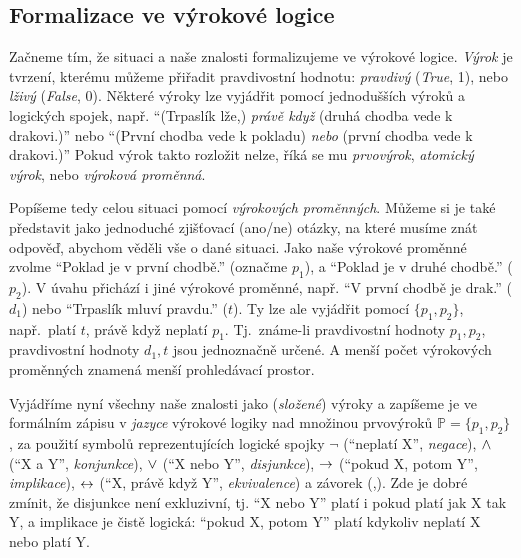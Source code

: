 \subsection{Formalizace ve výrokové logice}

Začneme tím, že situaci a naše znalosti formalizujeme ve výrokové logice. \emph{Výrok} je tvrzení, kterému můžeme přiřadit pravdivostní hodnotu: \emph{pravdivý} (\emph{True}, 1), nebo \emph{lživý} (\emph{False}, 0). Některé výroky lze vyjádřit pomocí jednodušších výroků a logických spojek, např.  ``(Trpaslík lže,) \emph{právě když} (druhá chodba vede k drakovi.)'' nebo ``(První chodba vede k pokladu) \emph{nebo} (první chodba vede k drakovi.)'' Pokud výrok takto rozložit nelze, říká se mu \emph{prvovýrok}, \emph{atomický výrok}, nebo \emph{výroková proměnná}.

Popíšeme tedy celou situaci pomocí \emph{výrokových proměnných}. Můžeme si je také představit jako jednoduché zjišťovací (ano/ne) otázky, na které musíme znát odpověď, abychom věděli vše o dané situaci. Jako naše výrokové proměnné zvolme ``Poklad je v první chodbě.'' (označme \(p_1\)), a ``Poklad je v druhé chodbě.'' (\(p_2\)). V úvahu přichází i jiné výrokové proměnné, např. ``V první chodbě je drak.'' (\(d_1\)) nebo ``Trpaslík mluví pravdu.'' (\(t\)). Ty lze ale vyjádřit pomocí \( \{p_1,p_2\} \), např.\ platí \(t\), právě když neplatí \(p_1\). Tj.\ známe-li pravdivostní hodnoty \(p_1,p_2\), pravdivostní hodnoty \(d_1,t\) jsou jednoznačně určené. A menší počet výrokových proměnných znamená menší prohledávací prostor.

Vyjádříme nyní všechny naše znalosti jako (\emph{složené}) výroky a zapíšeme je ve formálním zápisu v \emph{jazyce} výrokové logiky nad množinou prvovýroků \( \mathbb P=\{p_1,p_2\} \), za použití symbolů reprezentujících logické spojky \( \neg \) (``neplatí X'', \emph{negace}), \( {\land} \) (``X a Y'', \emph{konjunkce}), \( {\lor} \) (``X nebo Y'', \emph{disjunkce}), \( {\mathbin{\rightarrow}} \) (``pokud X, potom Y'', \emph{implikace}), \( {\mathbin{\leftrightarrow}} \) (``X, právě když Y'', \emph{ekvivalence}) a závorek (,). Zde je dobré zmínit, že disjunkce není exkluzivní, tj. ``X nebo Y'' platí i pokud platí jak X tak Y, a  implikace je čistě logická: ``pokud X, potom Y'' platí kdykoliv neplatí X nebo platí Y.

